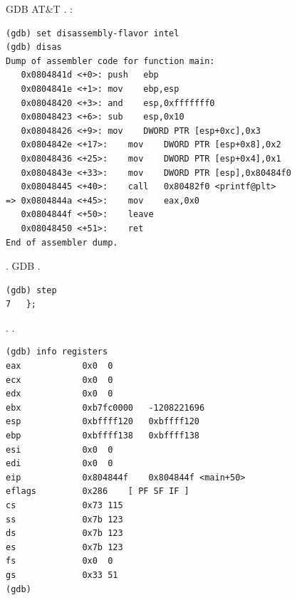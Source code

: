 \ac{GDB}  AT\&T 
.
:

\begin{lstlisting}
(gdb) set disassembly-flavor intel
(gdb) disas
Dump of assembler code for function main:
   0x0804841d <+0>:	push   ebp
   0x0804841e <+1>:	mov    ebp,esp
   0x08048420 <+3>:	and    esp,0xfffffff0
   0x08048423 <+6>:	sub    esp,0x10
   0x08048426 <+9>:	mov    DWORD PTR [esp+0xc],0x3
   0x0804842e <+17>:	mov    DWORD PTR [esp+0x8],0x2
   0x08048436 <+25>:	mov    DWORD PTR [esp+0x4],0x1
   0x0804843e <+33>:	mov    DWORD PTR [esp],0x80484f0
   0x08048445 <+40>:	call   0x80482f0 <printf@plt>
=> 0x0804844a <+45>:	mov    eax,0x0
   0x0804844f <+50>:	leave  
   0x08048450 <+51>:	ret    
End of assembler dump.
\end{lstlisting}

.
\ac{GDB} .

\begin{lstlisting}
(gdb) step
7	};
\end{lstlisting}

.
\EAX {}.

\begin{lstlisting}
(gdb) info registers
eax            0x0	0
ecx            0x0	0
edx            0x0	0
ebx            0xb7fc0000	-1208221696
esp            0xbffff120	0xbffff120
ebp            0xbffff138	0xbffff138
esi            0x0	0
edi            0x0	0
eip            0x804844f	0x804844f <main+50>
eflags         0x286	[ PF SF IF ]
cs             0x73	115
ss             0x7b	123
ds             0x7b	123
es             0x7b	123
fs             0x0	0
gs             0x33	51
(gdb) 
\end{lstlisting}
